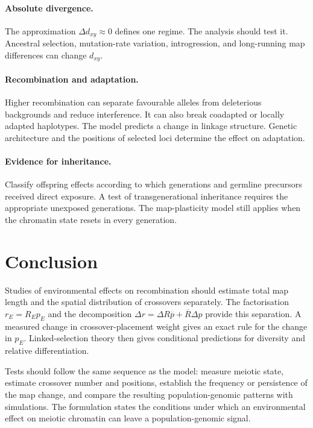 \documentclass[11pt]{article}
\theoremstyle{remark}
\newcommand{\Rbar}{\overline{R}}
\newcommand{\pbar}{\overline{p}}
\newcommand{\dxy}{d_{xy}}
\begin{document}
\paragraph{Absolute divergence.}
The approximation $\Delta\dxy\approx0$ defines one regime. The analysis should
test it. Ancestral selection, mutation-rate variation, introgression, and
long-running map differences can change $\dxy$.

\paragraph{Recombination and adaptation.}
Higher recombination can separate favourable alleles from deleterious backgrounds
and reduce interference. It can also break coadapted or locally adapted haplotypes.
The model predicts a change in linkage structure. Genetic architecture and the
positions of selected loci determine the effect on adaptation.

\paragraph{Evidence for inheritance.}
Classify offspring effects according to which generations and germline precursors
received direct exposure. A test of transgenerational inheritance requires the
appropriate unexposed generations. The map-plasticity model still applies when the
chromatin state resets in every generation.

\section{Conclusion}

Studies of environmental effects on recombination should estimate total map length
and the spatial distribution of crossovers separately. The factorisation
$r_E=R_Ep_E$ and the decomposition
$\Delta r=\Delta R\pbar+\Rbar\Delta p$ provide this separation. A measured change
in crossover-placement weight gives an exact rule for the change in $p_E$.
Linked-selection theory then gives conditional predictions for diversity and
relative differentiation.

Tests should follow the same sequence as the model: measure meiotic state, estimate
crossover number and positions, establish the frequency or persistence of the map
change, and compare the resulting population-genomic patterns with simulations.
The formulation states the conditions under which an environmental effect on
meiotic chromatin can leave a population-genomic signal.
\end{document}
